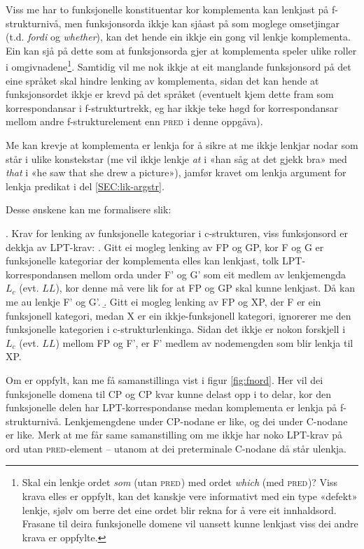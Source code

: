 \documentclass[12pt,a4paper,oneside,draft]{report}
\newcommand{\F}[2]{\textsc{#1}\ensuremath{_{#2}}}
\newcommand{\PRED}{\F{pred}{}}
\begin{document}
Viss me har to funksjonelle konstituentar kor komplementa kan lenkjast
 på f\hyp{}strukturnivå, men funksjonsorda ikkje kan sjåast på som moglege
 omsetjingar (t.d. \emph{fordi} og \emph{whether}), kan det hende ein ikkje ein
 gong vil lenkje komplementa. Ein kan sjå på dette som at
 funksjonsorda gjer at komplementa speler ulike roller i
 omgivnadene\footnote{Skal ein lenkje ordet \emph{som} (utan \PRED{}) med ordet \emph{which} (med
        \PRED{})? Viss krava elles er oppfylt, kan det kanskje vere
        informativt med ein type «defekt» lenkje, sjølv om berre det
        eine ordet blir rekna for å vere eit innhaldsord. Frasane til
        deira funksjonelle domene vil uansett kunne lenkjast viss dei andre
        krava er oppfylte. }. Samtidig vil me nok ikkje at eit manglande
 funksjonsord på det eine språket skal hindre lenking av komplementa,
 sidan det kan hende at funksjonsordet ikkje er krevd på det språket
 (eventuelt kjem dette fram som korrespondansar i f\hyp{}strukturtrekk, eg
 har ikkje teke høgd for korrespondansar mellom andre
 f\hyp{}strukturelement enn \PRED{} i denne oppgåva).

Me kan krevje at komplementa er lenkja for å sikre at me ikkje lenkjar
 nodar som står i ulike konstekstar (me vil ikkje lenkje \emph{at} i «han
 såg at det gjekk bra» med \emph{that} i «he saw that she drew a picture»),
 jamfør kravet om lenkja argument for lenkja predikat i del
 \ref{SEC:lik-argstr}.

Desse ønskene kan me formalisere slik:

\ex. \label{fnordkrav} Krav for lenking av funksjonelle kategoriar i
    c\hyp{}strukturen, viss funksjonsord er dekkja av LPT-krav:
\a. Gitt ei mogleg lenking av FP og GP, kor F og G er funksjonelle
    kategoriar der komplementa elles kan lenkjast,
    tolk LPT\hyp{}korrespondansen mellom orda under F' og G' som eit
    medlem av lenkjemengda $L_c$ (evt. $LL$), kor denne må vere lik
    for at FP og GP skal kunne lenkjast. Då kan me au lenkje F' og G'.
\b. Gitt ei mogleg lenking av FP og XP, der F er ein funksjonell
    kategori, medan X er ein ikkje-funksjonell kategori, ignorerer me
    den funksjonelle kategorien i c\hyp{}strukturlenkinga. Sidan det ikkje
    er nokon forskjell i $L_c$ (evt. $LL$) mellom FP og F', er F' medlem
    av nodemengden som blir lenkja til XP.

Om \Last[a] er oppfylt, kan me få samanstillinga vist i figur
 \ref{fig:fnord}. Her vil dei funksjonelle domena til CP og CP kvar
 kunne delast opp i to delar, kor den funksjonelle delen har
 LPT\hyp{}korrespondanse medan komplementa er lenkja på
 f\hyp{}strukturnivå. Lenkjemengdene under CP-nodane er like, og dei under
 C-nodane er like. Merk at me får same samanstilling om me ikkje har
 noko LPT-krav på ord utan \PRED{}-element -- utanom at dei
 preterminale C-nodane då står ulenkja.
\end{document}
